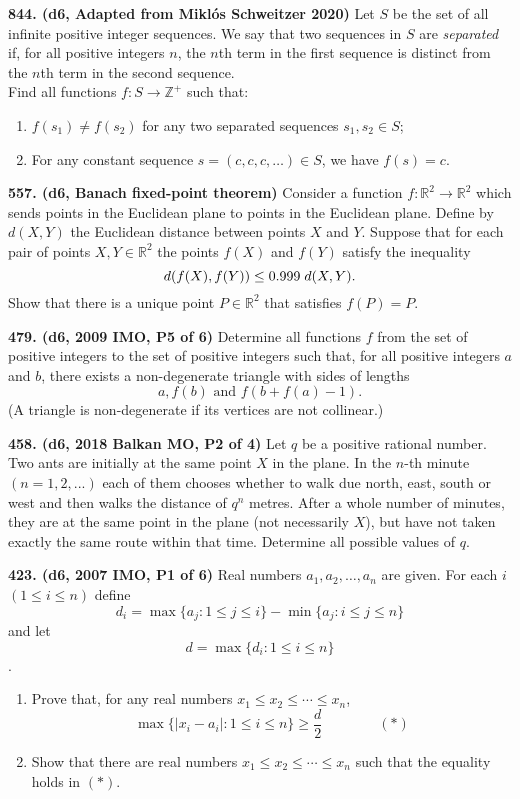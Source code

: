 \documentclass{article}
\begin{document}
\textbf{844. (\color{red}d6\color{black}, Adapted from Miklós Schweitzer 2020)} Let $S$ be the set of all infinite positive integer sequences. We say that two sequences in $S$ are \emph{separated} if, for all positive integers $n$, the $n$th term in the first sequence is distinct from the $n$th term in the second sequence. \\

Find all functions $f:S\to \mathbb{Z}^+$ such that:
\begin{enumerate}
    \item $f(s_1)\neq f(s_2)$ for any two separated sequences $s_1,s_2\in S$;
    \item For any constant sequence $s=(c,c,c,\dots)\in S$, we have $f(s)=c$.
\end{enumerate}

\textbf{557. (\color{red}d6\color{black}, Banach fixed-point theorem)} Consider a function $f: \mathbb{R}^2 \to \mathbb{R}^2$ which sends points in the Euclidean plane to points in the Euclidean plane. Define by $d(X, Y)$ the Euclidean distance between points $X$ and $Y.$ Suppose that for each pair of points $X, Y \in \mathbb{R}^2$ the points $f(X)$ and $f(Y)$ satisfy the inequality $$d(f(X), f(Y)) \leq 0.999 \hspace{0.1cm} d(X, Y).$$ Show that there is a unique point $P \in \mathbb{R}^2$ that satisfies $f(P) = P.$

\textbf{479. (\color{red}d6\color{black}, 2009 IMO, P5 of 6)} Determine all functions $ f$ from the set of positive integers to the set of positive integers such that, for all positive integers $ a$ and $ b$, there exists a non-degenerate triangle with sides of lengths
\[ a, f(b) \text{ and } f(b + f(a) - 1).\]
(A triangle is non-degenerate if its vertices are not collinear.)

\textbf{458. (\color{red}d6\color{black}, 2018 Balkan MO, P2 of 4)} Let $q$ be a positive rational number. Two ants are initially at the same point $X$ in the plane. In the $n$-th minute $(n = 1,2,...)$ each of them chooses whether to walk due north, east, south or west and then walks the distance of $q^n$ metres. After a whole number of minutes, they are at the same point in the plane (not necessarily $X$), but have not taken exactly the same route within that time. Determine all possible values of $q$.

\textbf{423. (\color{red}d6\color{black}, 2007 IMO, P1 of 6)} Real numbers $ a_{1}, a_{2}, \ldots, a_{n}$ are given. For each $i$ $ (1 \leq i \leq n )$ define
\[d_{i} = \max \{ a_{j} : 1 \leq j \leq i \} - \min \{ a_{j} : i \leq j \leq n \}\]
and let \[d = \max \{d_{i} : 1 \leq i \leq n \}\].
\renewcommand{\labelenumi}{\theenumi}
\renewcommand{\theenumi}{(\alph{enumi})}
\begin{enumerate}
    \item Prove that, for any real numbers $ x_{1}\leq x_{2}\leq \cdots \leq x_{n}$,
          \[\max \{ |x_{i} - a_{i}| : 1 \leq i \leq n \}\geq \frac {d}{2} \qquad \qquad (*)\]
    \item Show that there are real numbers $ x_{1}\leq x_{2}\leq \cdots \leq x_{n}$ such that the equality holds in \((*)\).
\end{enumerate}
\end{document}
